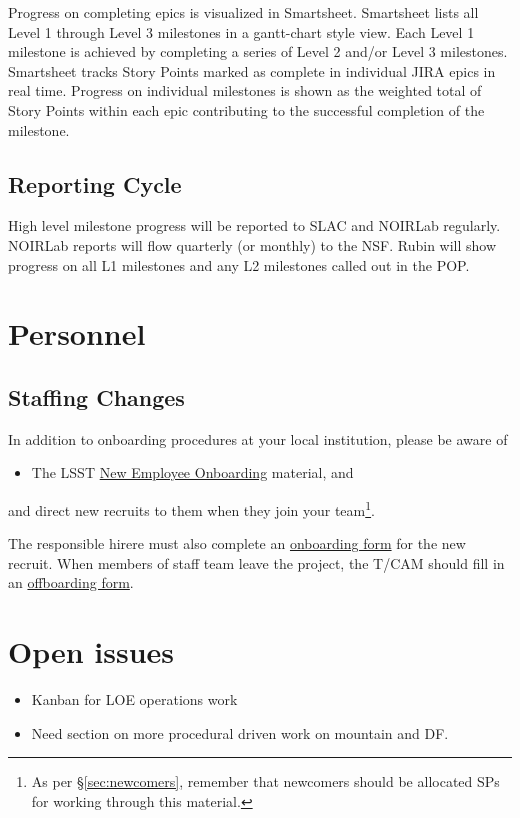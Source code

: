 Progress on completing epics is visualized in Smartsheet.
Smartsheet lists all Level 1 through Level 3 milestones in a gantt-chart style view.
Each Level 1 milestone is achieved by completing a series of Level 2 and/or Level 3 milestones.
Smartsheet tracks Story Points marked as complete in individual \gls{JIRA} epics in real time.
Progress on individual milestones is shown as the weighted total of Story Points within each epic contributing to the successful completion of the milestone.

\subsection{Reporting Cycle}

High level milestone progress will be reported to SLAC and NOIRLab regularly.
NOIRLab reports will flow quarterly (or monthly) to the NSF.
Rubin will show progress on all L1 milestones and any L2 milestones called out in the POP.


\section{Personnel}

\subsection{Staffing Changes}
\label{sec:staffing}

In addition to onboarding procedures at your local institution, please
be aware of

\begin{itemize}
\item The \gls{LSST} \href{https://project.lsst.org/onboarding}{New Employee
  Onboarding} material, and
\end{itemize}

and direct new recruits to them when they join your team\footnote{As per \S\ref{sec:newcomers}, remember that newcomers should be allocated \glspl{SP} for working through this material.}.

The responsible hirere must also complete an \href{https://project.lsst.org/onboarding/form}{onboarding form} for the new recruit.
When members of staff team leave the project, the \gls{T/CAM} should fill in an \href{https://project.lsst.org/onboarding/offboarding_form}{offboarding form}.


\section{Open issues}

\begin{itemize}
\item Kanban for \gls{LOE} operations work
\item Need section on more procedural driven work on mountain and DF.
\end{itemize}
